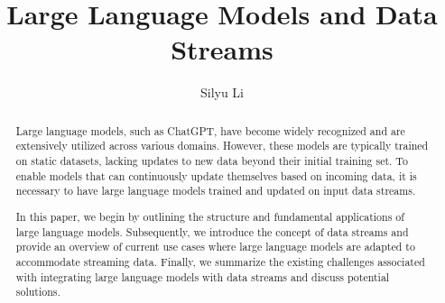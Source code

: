 \documentclass[runningheads]{llncs}
\begin{document}
%
%
%
\title{Large Language Models and Data Streams}
%
%
\author{Silyu Li}
%
%
%
\maketitle              %
%
\begin{abstract}
    Large language models, such as ChatGPT, have become widely recognized and are extensively utilized across various domains. However, these models are typically trained on static datasets, lacking updates to new data beyond their initial training set. 
    To enable models that can continuously update themselves based on incoming data, it is necessary to have large language models trained and updated on input data streams.

    In this paper, we begin by outlining the structure and fundamental applications of large language models. Subsequently, we introduce the concept of data streams and provide an overview of current use cases where large language models are adapted to accommodate streaming data. Finally, we summarize the existing challenges associated with integrating large language models with data streams and discuss potential solutions.
\end{abstract}
%
%
%
\end{document}

